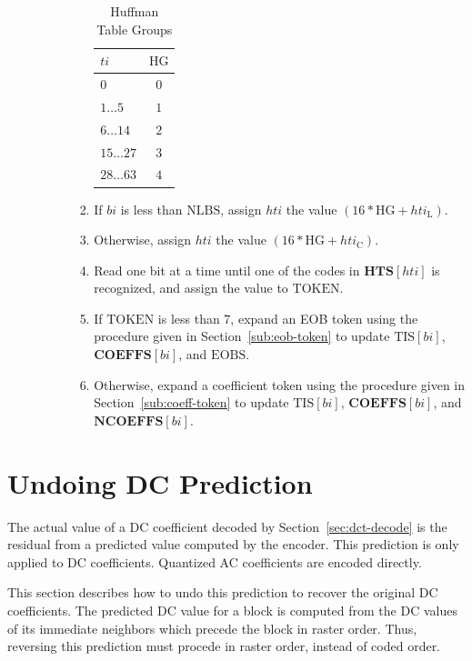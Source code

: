 \documentclass[9pt,letterpaper]{book}
\newcommand{\idx}[1]{{\ensuremath{\mathit{#1}}}}
\newcommand{\hti}{\idx{hti}}
\newcommand{\bi}{\idx{bi}}
\newcommand{\ti}{\idx{ti}}
\newcommand{\bitvar}[1]{\ensuremath{\mathbf{\bm{#1}}}}
\newcommand{\locvar}[1]{\ensuremath{\mathrm{#1}}}
\numberwithin{equation}{chapter}
\numberwithin{figure}{chapter}
\numberwithin{table}{chapter}
\begin{document}
\begin{enumerate}
\begin{enumerate}
\begin{enumerate}
\begin{enumerate}
\begin{table}[htbp]
\begin{center}
\begin{tabular}{lc}\toprule
\locvar{\ti}  & \locvar{HG} \\\midrule
$0$           & $0$ \\
$1\ldots 5$   & $1$ \\
$6\ldots 14$  & $2$ \\
$15\ldots 27$ & $3$ \\
$28\ldots 63$ & $4$ \\
\bottomrule\end{tabular}
\end{center}
\caption{Huffman Table Groups}
\label{tab:huff-groups}
\end{table}

\item
If \locvar{\bi} is less than \locvar{NLBS}, assign \locvar{\hti} the value
 $(16*\locvar{HG}+\locvar{\hti_L})$.
\item
Otherwise, assign \locvar{\hti} the value
 $(16*\locvar{HG}+\locvar{\hti_C})$.
\item
Read one bit at a time until one of the codes in $\bitvar{HTS}[\locvar{\hti}]$
 is recognized, and assign the value to \locvar{TOKEN}.
\item
If \locvar{TOKEN} is less than 7, expand an EOB token using the procedure given
 in Section~\ref{sub:eob-token} to update $\locvar{TIS}[\locvar{\bi}]$,
 $\bitvar{COEFFS}[\locvar{\bi}]$, and \locvar{EOBS}.
\item
Otherwise, expand a coefficient token using the procedure given in
 Section~\ref{sub:coeff-token} to update $\locvar{TIS}[\locvar{\bi}]$,
 $\bitvar{COEFFS}[\locvar{\bi}]$, and $\bitvar{NCOEFFS}[\locvar{\bi}]$.
\end{enumerate}
\end{enumerate}
\end{enumerate}
\end{enumerate}

\section{Undoing DC Prediction}

The actual value of a DC coefficient decoded by Section~\ref{sec:dct-decode} is
 the residual from a predicted value computed by the encoder.
This prediction is only applied to DC coefficients.
Quantized AC coefficients are encoded directly.

This section describes how to undo this prediction to recover the original
 DC coefficients.
The predicted DC value for a block is computed from the DC values of its
 immediate neighbors which precede the block in raster order.
Thus, reversing this prediction must procede in raster order, instead of coded
 order.
\end{document}
